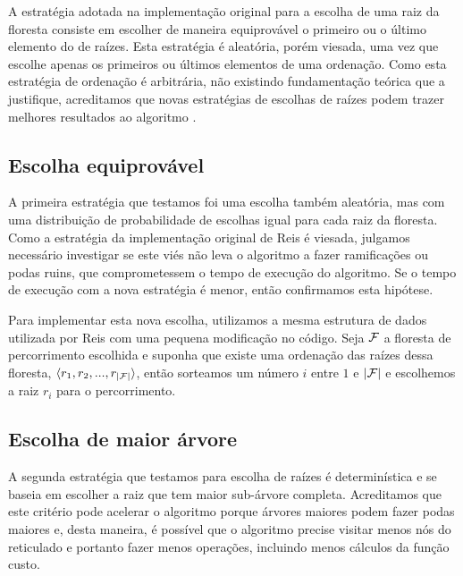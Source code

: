 A estratégia adotada na implementação original para a escolha de uma raiz da floresta 
consiste em escolher de maneira equiprovável o primeiro ou o último 
elemento do  de raízes. Esta estratégia é aleatória, porém viesada, uma vez que escolhe apenas os primeiros ou últimos elementos de uma ordenação. Como esta estratégia de ordenação é arbitrária, não existindo fundamentação teórica que a justifique, acreditamos que novas 
estratégias de escolhas de raízes podem trazer melhores resultados ao algoritmo .

\subsection{Escolha equiprovável}
A primeira estratégia que testamos foi uma escolha também aleatória, mas
com uma distribuição de probabilidade de escolhas igual para cada raiz
da floresta. Como a estratégia da implementação original de Reis é viesada, julgamos necessário
investigar se este viés não leva o algoritmo a fazer ramificações ou 
podas ruins, que comprometessem o tempo de execução do algoritmo. Se
o tempo de execução com a nova estratégia é menor, então confirmamos
esta hipótese.

Para implementar esta nova escolha, utilizamos a mesma estrutura de 
dados utilizada por Reis com uma pequena modificação no código. Seja
$\mathcal{F}$ a floresta de percorrimento escolhida e suponha que existe
uma ordenação das raízes dessa floresta, 
$\langle r_1, r_2, ..., r_{|\mathcal{F}|} \rangle$, então sorteamos um 
número $i$ entre $1$ e $|\mathcal{F}|$ e escolhemos a raiz $r_{i}$ para o
percorrimento.


\subsection{Escolha de maior árvore}
A segunda estratégia que testamos para escolha de raízes é 
determinística e se baseia em escolher a raiz que tem maior 
sub-árvore completa. Acreditamos que este critério pode acelerar o
algoritmo porque árvores maiores podem fazer podas maiores e, desta 
maneira, é possível que o algoritmo precise visitar menos nós do 
reticulado e portanto fazer menos operações, incluindo menos cálculos
da função custo.

